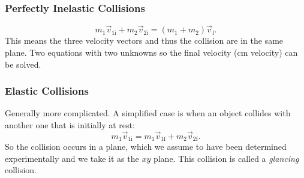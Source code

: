 \documentclass[11pt,a4paper]{report}
\begin{document}
\subsubsection{Perfectly Inelastic Collisions}
$$m_1 \vec{v}_{1\mathrm{i}} + m_2 \vec{v}_{2\mathrm{i}} = \left(m_1 + m_2\right) \vec{v}_\mathrm{f}.$$
This means the three velocity vectors and thus the collision are in the same plane. Two equations with two unknowns so the final velocity (cm velocity) can be solved.

\subsubsection{Elastic Collisions}
Generally more complicated. A simplified case is when an object collides with another one that is initially at rest: $$m_1 \vec{v}_{1\mathrm{i}} = m_1 \vec{v}_{1\mathrm{f}} + m_2 \vec{v}_{2\mathrm{f}}.$$
So the collision occurs in a plane, which we assume to have been determined experimentally and we take it as the $xy$ plane. This collision is called a \textit{glancing} collision.
\end{document}
